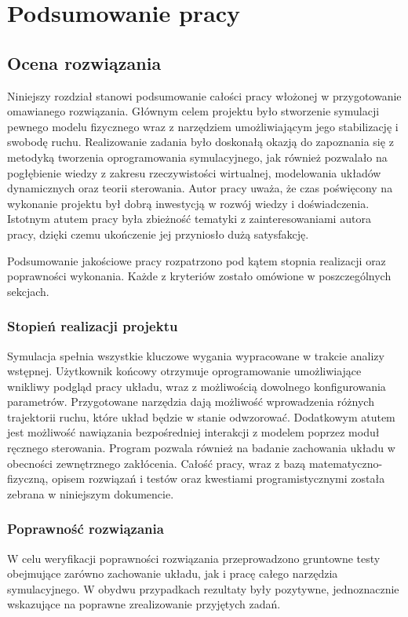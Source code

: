 \documentclass[12pt, oneside]{report}
\theoremstyle{definition}
\begin{document}
\newpage
\chapter{Podsumowanie pracy}
\section{Ocena rozwiązania}
Niniejszy rozdział stanowi podsumowanie całości pracy włożonej w przygotowanie omawianego rozwiązania. Głównym celem projektu było stworzenie symulacji pewnego modelu fizycznego wraz z narzędziem umożliwiającym jego stabilizację i swobodę ruchu. Realizowanie zadania było doskonałą okazją do zapoznania się z metodyką tworzenia oprogramowania symulacyjnego, jak również pozwalało na pogłębienie wiedzy z zakresu rzeczywistości wirtualnej, modelowania układów dynamicznych oraz teorii sterowania. Autor pracy uważa, że czas poświęcony na wykonanie projektu był dobrą inwestycją w rozwój wiedzy i doświadczenia. Istotnym atutem pracy była zbieżność tematyki z zainteresowaniami autora pracy, dzięki czemu ukończenie jej przyniosło dużą satysfakcję. 

Podsumowanie jakościowe pracy rozpatrzono pod kątem stopnia realizacji oraz poprawności wykonania. Każde z kryteriów zostało omówione w poszczególnych sekcjach.

\subsection{Stopień realizacji projektu}
Symulacja spełnia wszystkie kluczowe wygania wypracowane w trakcie analizy wstępnej. Użytkownik końcowy otrzymuje oprogramowanie umożliwiające wnikliwy podgląd pracy układu, wraz z możliwością dowolnego konfigurowania parametrów. Przygotowane narzędzia dają możliwość wprowadzenia różnych trajektorii ruchu, które układ będzie w stanie odwzorować. Dodatkowym atutem jest możliwość nawiązania bezpośredniej interakcji z modelem poprzez moduł ręcznego sterowania. Program pozwala również na badanie zachowania układu w obecności zewnętrznego zakłócenia. Całość pracy, wraz z bazą matematyczno-fizyczną, opisem rozwiązań i testów oraz kwestiami programistycznymi została zebrana w niniejszym dokumencie.

\subsection{Poprawność rozwiązania}
W celu weryfikacji poprawności rozwiązania przeprowadzono gruntowne testy obejmujące zarówno zachowanie układu, jak i pracę całego narzędzia symulacyjnego. W obydwu przypadkach rezultaty były pozytywne, jednoznacznie wskazujące na poprawne zrealizowanie przyjętych zadań.
\end{document}
